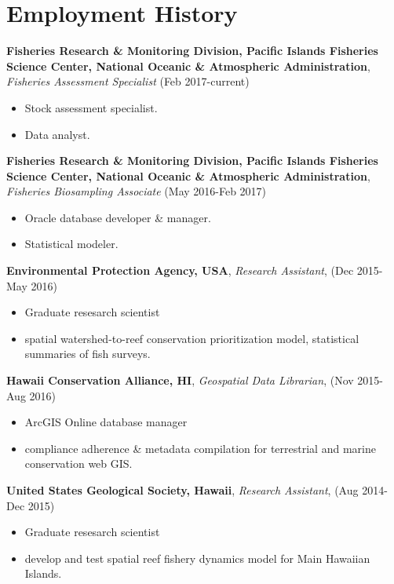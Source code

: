 \documentclass[10pt, letterpaper]{article}
\begin{document}
\section*{Employment History}
\textbf{Fisheries Research \& Monitoring Division, Pacific Islands Fisheries Science Center, National Oceanic \& Atmospheric Administration}, \textit{Fisheries Assessment Specialist} (Feb 2017-current)
\begin{itemize}
\vspace{-2.5mm}
  \item Stock assessment specialist.
  \item Data analyst.
\end{itemize}
\textbf{Fisheries Research \& Monitoring Division, Pacific Islands Fisheries Science Center, National Oceanic \& Atmospheric Administration}, \textit{Fisheries Biosampling Associate} (May 2016-Feb 2017)
\begin{itemize}
\vspace{-2.5mm}
\item Oracle database developer \& manager.
\item Statistical modeler.
\end{itemize}
\textbf{Environmental Protection Agency, USA}, \textit{Research Assistant}, (Dec 2015- May 2016)
\begin{itemize}
\vspace{-2.5mm}
\item Graduate resesarch scientist
\item spatial watershed-to-reef conservation prioritization model, statistical summaries of fish surveys.
\end{itemize}
\textbf{Hawaii Conservation Alliance, HI}, \textit{Geospatial Data Librarian}, (Nov 2015- Aug 2016)
\begin{itemize}
\vspace{-2.5mm}
\item ArcGIS Online database manager
\item compliance adherence \& metadata compilation for terrestrial and marine conservation web GIS.
\end{itemize}
\textbf{United States Geological Society, Hawaii}, \textit{Research Assistant}, (Aug 2014- Dec 2015)
\begin{itemize}
\vspace{-2.5mm}
\item Graduate resesarch scientist
\item develop and test spatial reef fishery dynamics model for Main Hawaiian Islands.
\end{itemize}
\end{document}
